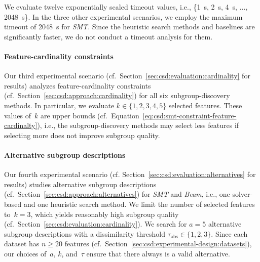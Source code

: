 \documentclass{article}
\theoremstyle{definition}
\begin{document}
We evaluate twelve exponentially scaled timeout values, i.e., \{1~s, 2~s, 4~s, $\dots$, 2048~s\}.
In the three other experimental scenarios, we employ the maximum timeout of 2048~s for \emph{SMT}.
Since the heuristic search methods and baselines are significantly faster, we do not conduct a timeout analysis for them.

\paragraph{Feature-cardinality constraints}

Our third experimental scenario (cf.~Section~\ref{sec:csd:evaluation:cardinality} for results) analyzes feature-cardinality constraints (cf.~Section~\ref{sec:csd:approach:cardinality}) for all six subgroup-discovery methods.
In particular, we evaluate $k \in \{1, 2, 3, 4, 5\}$ selected features.
These values of~$k$ are upper bounds (cf.~Equation~\ref{eq:csd:smt-constraint-feature-cardinalty}), i.e., the subgroup-discovery methods may select less features if selecting more does not improve subgroup quality.

\paragraph{Alternative subgroup descriptions}

Our fourth experimental scenario (cf. Section~\ref{sec:csd:evaluation:alternatives} for results) studies alternative subgroup descriptions (cf.~Section~\ref{sec:csd:approach:alternatives}) for \emph{SMT} and \emph{Beam}, i.e., one solver-based and one heuristic search method.
We limit the number of selected features to~$k=3$, which yields reasonably high subgroup quality (cf.~Section~\ref{sec:csd:evaluation:cardinality}).
We search for $a=5$ alternative subgroup descriptions with a dissimilarity threshold $\tau_{\text{abs}} \in \{1, 2, 3\}$.
Since each dataset has $n \geq 20$ features (cf.~Section~\ref{sec:csd:experimental-design:datasets}), our choices of~$a$, $k$, and~$\tau$ ensure that there always is a valid alternative.
\end{document}
